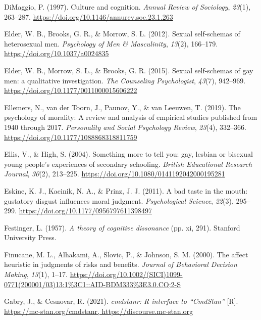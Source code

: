 \documentclass[
  donotrepeattitle,doc, 12pt, a4paper,floatsintext]{apa7}
\newlength{\cslhangindent}
\newlength{\cslentryspacingunit} %
\newenvironment{CSLReferences}[2] %
 {%
  \setlength{\parindent}{0pt}
  \ifodd #1
  \let\oldpar\par
  \def\par{\hangindent=\cslhangindent\oldpar}
  \fi
  \setlength{\parskip}{#2\cslentryspacingunit}
 }%
 {}
\begin{document}
\begin{CSLReferences}{1}{0}
\leavevmode{}%
DiMaggio, P. (1997). Culture and cognition. \emph{Annual Review of Sociology}, \emph{23}(1), 263--287. \url{https://doi.org/10.1146/annurev.soc.23.1.263}

\leavevmode{}%
Elder, W. B., Brooks, G. R., \& Morrow, S. L. (2012). Sexual self-schemas of heterosexual men. \emph{Psychology of Men \& Masculinity}, \emph{13}(2), 166--179. \url{https://doi.org/10.1037/a0024835}

\leavevmode{}%
Elder, W. B., Morrow, S. L., \& Brooks, G. R. (2015). Sexual self-schemas of gay men: a qualitative investigation. \emph{The Counseling Psychologist}, \emph{43}(7), 942--969. \url{https://doi.org/10.1177/0011000015606222}

\leavevmode{}%
Ellemers, N., van der Toorn, J., Paunov, Y., \& van Leeuwen, T. (2019). The psychology of morality: A review and analysis of empirical studies published from 1940 through 2017. \emph{Personality and Social Psychology Review}, \emph{23}(4), 332--366. \url{https://doi.org/10.1177/1088868318811759}

\leavevmode{}%
Ellis, V., \& High, S. (2004). Something more to tell you: gay, lesbian or bisexual young people's experiences of secondary schooling. \emph{British Educational Research Journal}, \emph{30}(2), 213--225. \url{https://doi.org/10.1080/0141192042000195281}

\leavevmode{}%
Eskine, K. J., Kacinik, N. A., \& Prinz, J. J. (2011). A bad taste in the mouth: gustatory disgust influences moral judgment. \emph{Psychological Science}, \emph{22}(3), 295--299. \url{https://doi.org/10.1177/0956797611398497}

\leavevmode{}%
Festinger, L. (1957). \emph{A theory of cognitive dissonance} (pp. xi, 291). Stanford University Press.

\leavevmode{}%
Finucane, M. L., Alhakami, A., Slovic, P., \& Johnson, S. M. (2000). The affect heuristic in judgments of risks and benefits. \emph{Journal of Behavioral Decision Making}, \emph{13}(1), 1--17. \url{https://doi.org/10.1002/(SICI)1099-0771(200001/03)13:1\%3C1::AID-BDM333\%3E3.0.CO;2-S}

\leavevmode{}%
Gabry, J., \& Cesnovar, R. (2021). \emph{cmdstanr: R interface to {``CmdStan''}} {[}R{]}. \href{https://mc-stan.org/cmdstanr,\%20https://discourse.mc-stan.org}{https://mc-stan.org/cmdstanr, https://discourse.mc-stan.org}


\end{CSLReferences}
\end{document}
